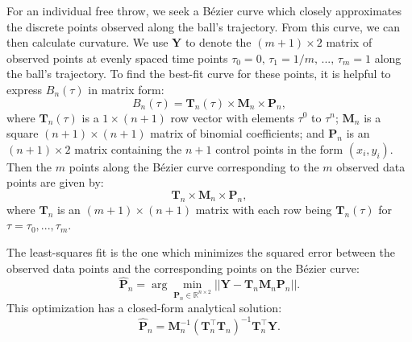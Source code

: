 \documentclass{article}
\begin{document}
            For an individual free throw, we seek a Bézier curve which closely approximates the discrete points observed along the ball's trajectory. From this curve, we can then calculate curvature. We use \(\mathbf{Y}\) to denote the \( (m + 1) \times 2\) matrix of observed points at evenly spaced time points $\tau_0 = 0,\, \tau_1 = 1 / m,\, ...,\, \tau_m = 1$ along the ball's trajectory. To find the best-fit curve for these points, it is helpful to express \(B_n(\tau)\) in matrix form:
            \[
              B_n(\tau) = \mathbf{T}_n(\tau) \times \mathbf{M}_n \times \mathbf{P}_n,
            \]
            where \( \mathbf{T}_n(\tau) \) is a \( 1 \times (n+1) \) row vector with elements \( \tau^0 \) to \( \tau^n \); \( \mathbf{M}_n \) is a square \( (n+1) \times (n+1) \) matrix of binomial coefficients; and \( \mathbf{P}_n \) is an \( (n+1) \times 2 \) matrix containing the \( n+1 \) control points in the form \( (x_i, y_i) \). Then the $m$ points along the Bézier curve corresponding to the $m$ observed data points are given by:
            \[
              \mathbf{T}_n \times \mathbf{M}_n \times \mathbf{P}_n,
            \]
            where \( \mathbf{T}_n \) is an \( (m + 1) \times (n+1) \) matrix with each row being \( \mathbf{T}_n(\tau) \) for $\tau = \tau_0, ..., \tau_m$.

            The least-squares fit is the one which minimizes the squared error between the observed data points and the corresponding points on the Bézier curve:
            \[
              \hat{\mathbf{P}}_n = \arg\min_{\mathbf{P}_n \in \mathbb{R}^{n \times 2}} ||\mathbf{Y} - \mathbf{T}_n \mathbf{M}_n \mathbf{P}_n||.
            \]
            This optimization has a closed-form analytical solution:
            \[
              \hat{\mathbf{P}}_n = \mathbf{M}_n^{-1} (\mathbf{T}_n^\top \mathbf{T}_n)^{-1} \mathbf{T}_n^\top \mathbf{Y}.
            \]
            
            
            
\end{document}
